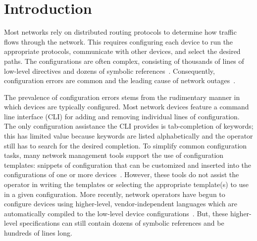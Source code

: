 \section{Introduction}

Most networks rely on distributed routing protocols to determine how traffic
flows through the network. This requires configuring each device to run the
appropriate protocols, communicate with other devices, and select the desired
paths.
The configurations are often complex, consisting of thousands of lines of
low-level directives and dozens of symbolic references~\cite{complexity}.
Consequently, configuration errors are common and the leading cause of
network outages~\cite{downtime}.

The prevalence of configuration errors stems from the rudimentary manner in
which devices are typically configured. Most network devices feature a
command line interface (CLI) for adding and removing individual lines of
configuration. The only configuration assistance the CLI provides is
tab-completion of keywords; this has limited value because keywords are
listed alphabetically and the operator still has to search for the desired
completion. To simplify common configuration tasks, many network management
tools support the use of configuration templates: snippets of configuration
that can be customized and inserted into the configurations of one or more
devices~\cite{complexity}. However, these tools do not assist the operator in
writing the templates or selecting the appropriate template(s) to use in a
given configuration. More recently, network operators have begun to configure
devices using higher-level, vendor-independent languages which are
automatically compiled to the low-level device configurations~\cite{kees}.
But, these higher-level specifications can still contain dozens of symbolic
references and be hundreds of lines long.


